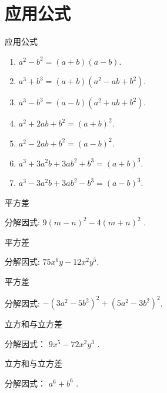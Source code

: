 \documentclass[aspectratio=169]{ctexbeamer}
\theoremstyle{definition}
\begin{document}
\section{应用公式}
\begin{frame}{应用公式}
	\begin{enumerate}
		\item $a^{2}-b^{2}=(a+b)(a-b)$.
		\item $a^{3}+b^{3}=(a+b)\left(a^{2}-a b+b^{2}\right)$.
		\item $a^{3}-b^{3}=(a-b)\left(a^{2}+a b+b^{2}\right)$.
		\item $a^{2}+2 a b+b^{2}=(a+b)^{2}$.
		\item $a^{2}-2 a b+b^{2}=(a-b)^{2}$.
		\item $a^{3}+3 a^{2} b+3 a b^{2}+b^{3}=(a+b)^{3}$.
		\item $a^{3}-3 a^{2} b+3 a b^{2}-b^{3}=(a-b)^{3}$.
	\end{enumerate}
\end{frame}

\setcounter{theorem}{0}
\begin{frame}[t]{平方差}
	\begin{example}
		分解因式: $9(m-n)^{2}-4(m+n)^{2}$ .
	\end{example}
\end{frame}

\begin{frame}[t]{平方差}
	\begin{example}
		分解因式: $75 x^{6} y-12 x^{2} y^{5}$.
	\end{example}
\end{frame}

\begin{frame}[t]{平方差}
	\begin{example}\label{ex:应用公式-例3}
		分解因式: $-\left(3 a^{2}-5 b^{2}\right)^{2}+\left(5 a^{2}-3 b^{2}\right)^{2}$.
	\end{example}
\end{frame}


\begin{frame}[t]{立方和与立方差}
	\begin{example}
		分解因式： $9 x^{5}-72 x^{2} y^{3}$ .
	\end{example}
\end{frame}

\begin{frame}[t]{立方和与立方差}
	\begin{example}
		分解因式： $a^{6}+b^{6}$ .
	\end{example}
\end{frame}
\end{document}
